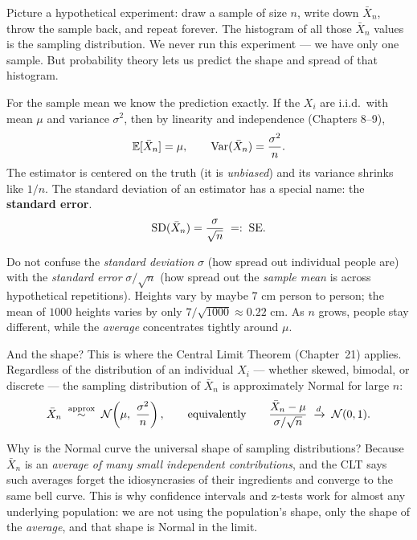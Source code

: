 \begin{intuitionbox}
Picture a hypothetical experiment: draw a sample of size $n$, write down
$\bar X_n$, throw the sample back, and repeat forever. The histogram of all those
$\bar X_n$ values is the sampling distribution. We never run this
experiment --- we have only one sample. But probability theory lets us
predict the shape and spread of that histogram.
\end{intuitionbox}

For the sample mean we know the prediction exactly. If the $X_i$ are i.i.d.\ with mean
$\mu$ and variance $\sigma^2$, then by linearity and independence (Chapters 8--9),
\[
  \operatorname{\mathbb{E}}[\bar X_n] = \mu, \qquad \operatorname{Var}(\bar X_n) = \frac{\sigma^2}{n}.
\]
The estimator is centered on the truth (it is \emph{unbiased}) and its variance shrinks
like $1/n$. The standard deviation of an estimator has a special name: the
\textbf{standard error}.
\[
  \operatorname{SD}(\bar X_n) = \frac{\sigma}{\sqrt n} \;=:\; \mathrm{SE}.
\]

\begin{trapbox}
Do not confuse the \emph{standard deviation} $\sigma$ (how spread out individual people
are) with the \emph{standard error} $\sigma/\sqrt n$ (how spread out the \emph{sample
mean} is across hypothetical repetitions). Heights vary by maybe $7$ cm person to
person; the mean of $1000$ heights varies by only $7/\sqrt{1000}\approx 0.22$ cm. As $n$ grows, people stay different, while the \emph{average} concentrates tightly around $\mu$.
\end{trapbox}

And the shape? This is where the Central Limit Theorem (Chapter~21) applies. Regardless
of the distribution of an individual $X_i$ --- whether skewed, bimodal, or discrete ---
the sampling distribution of $\bar X_n$ is approximately Normal for large $n$:
\[
  \bar X_n \;\overset{\text{approx}}{\sim}\; \mathcal{N}\!\left(\mu,\ \frac{\sigma^2}{n}\right),
  \qquad\text{equivalently}\qquad
  \frac{\bar X_n - \mu}{\sigma/\sqrt n} \;\xrightarrow{d}\; \mathcal{N}(0,1).
\]

\begin{whybox}
Why is the Normal curve the universal shape of sampling distributions? Because
$\bar X_n$ is an \emph{average of many small independent contributions}, and the CLT
says such averages forget the idiosyncrasies of their ingredients and converge to the
same bell curve. This is why confidence intervals and z-tests work for
almost any underlying population: we are not using the population's shape, only
the shape of the \emph{average}, and that shape is Normal in the limit.
\end{whybox}


